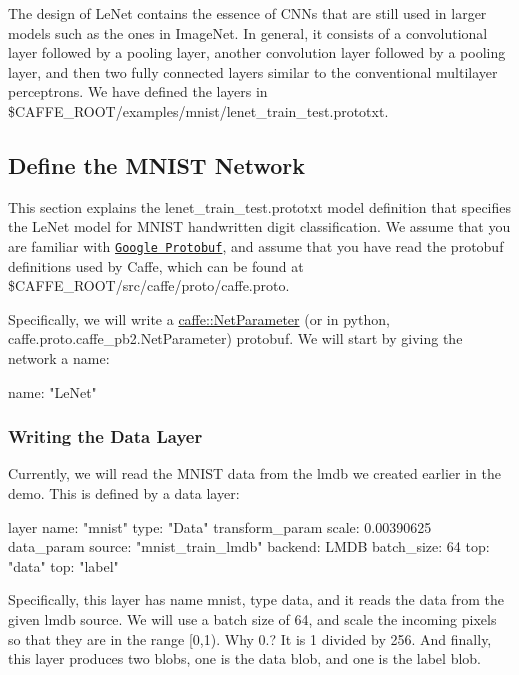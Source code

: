 The design of Le\+Net contains the essence of C\+N\+Ns that are still used in larger models such as the ones in Image\+Net. In general, it consists of a convolutional layer followed by a pooling layer, another convolution layer followed by a pooling layer, and then two fully connected layers similar to the conventional multilayer perceptrons. We have defined the layers in {\ttfamily \$\+C\+A\+F\+F\+E\+\_\+\+R\+O\+OT/examples/mnist/lenet\+\_\+train\+\_\+test.prototxt}.

\subsection*{Define the M\+N\+I\+ST Network}

This section explains the {\ttfamily lenet\+\_\+train\+\_\+test.\+prototxt} model definition that specifies the Le\+Net model for M\+N\+I\+ST handwritten digit classification. We assume that you are familiar with \href{https://developers.google.com/protocol-buffers/docs/overview}{\tt Google Protobuf}, and assume that you have read the protobuf definitions used by Caffe, which can be found at {\ttfamily \$\+C\+A\+F\+F\+E\+\_\+\+R\+O\+OT/src/caffe/proto/caffe.proto}.

Specifically, we will write a {\ttfamily \mbox{\hyperlink{classcaffe_1_1_net_parameter}{caffe\+::\+Net\+Parameter}}} (or in python, {\ttfamily caffe.\+proto.\+caffe\+\_\+pb2.\+Net\+Parameter}) protobuf. We will start by giving the network a name\+: \begin{DoxyVerb}name: "LeNet"
\end{DoxyVerb}


\subsubsection*{Writing the Data Layer}

Currently, we will read the M\+N\+I\+ST data from the lmdb we created earlier in the demo. This is defined by a data layer\+: \begin{DoxyVerb}layer {
  name: "mnist"
  type: "Data"
  transform_param {
    scale: 0.00390625
  }
  data_param {
    source: "mnist_train_lmdb"
    backend: LMDB
    batch_size: 64
  }
  top: "data"
  top: "label"
}
\end{DoxyVerb}


Specifically, this layer has name {\ttfamily mnist}, type {\ttfamily data}, and it reads the data from the given lmdb source. We will use a batch size of 64, and scale the incoming pixels so that they are in the range \mbox{[}0,1). Why 0.? It is 1 divided by 256. And finally, this layer produces two blobs, one is the {\ttfamily data} blob, and one is the {\ttfamily label} blob.

